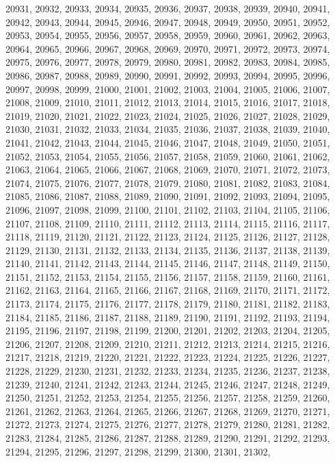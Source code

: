 20931,
20932,
20933,
20934,
20935,
20936,
20937,
20938,
20939,
20940,
20941,
20942,
20943,
20944,
20945,
20946,
20947,
20948,
20949,
20950,
20951,
20952,
20953,
20954,
20955,
20956,
20957,
20958,
20959,
20960,
20961,
20962,
20963,
20964,
20965,
20966,
20967,
20968,
20969,
20970,
20971,
20972,
20973,
20974,
20975,
20976,
20977,
20978,
20979,
20980,
20981,
20982,
20983,
20984,
20985,
20986,
20987,
20988,
20989,
20990,
20991,
20992,
20993,
20994,
20995,
20996,
20997,
20998,
20999,
21000,
21001,
21002,
21003,
21004,
21005,
21006,
21007,
21008,
21009,
21010,
21011,
21012,
21013,
21014,
21015,
21016,
21017,
21018,
21019,
21020,
21021,
21022,
21023,
21024,
21025,
21026,
21027,
21028,
21029,
21030,
21031,
21032,
21033,
21034,
21035,
21036,
21037,
21038,
21039,
21040,
21041,
21042,
21043,
21044,
21045,
21046,
21047,
21048,
21049,
21050,
21051,
21052,
21053,
21054,
21055,
21056,
21057,
21058,
21059,
21060,
21061,
21062,
21063,
21064,
21065,
21066,
21067,
21068,
21069,
21070,
21071,
21072,
21073,
21074,
21075,
21076,
21077,
21078,
21079,
21080,
21081,
21082,
21083,
21084,
21085,
21086,
21087,
21088,
21089,
21090,
21091,
21092,
21093,
21094,
21095,
21096,
21097,
21098,
21099,
21100,
21101,
21102,
21103,
21104,
21105,
21106,
21107,
21108,
21109,
21110,
21111,
21112,
21113,
21114,
21115,
21116,
21117,
21118,
21119,
21120,
21121,
21122,
21123,
21124,
21125,
21126,
21127,
21128,
21129,
21130,
21131,
21132,
21133,
21134,
21135,
21136,
21137,
21138,
21139,
21140,
21141,
21142,
21143,
21144,
21145,
21146,
21147,
21148,
21149,
21150,
21151,
21152,
21153,
21154,
21155,
21156,
21157,
21158,
21159,
21160,
21161,
21162,
21163,
21164,
21165,
21166,
21167,
21168,
21169,
21170,
21171,
21172,
21173,
21174,
21175,
21176,
21177,
21178,
21179,
21180,
21181,
21182,
21183,
21184,
21185,
21186,
21187,
21188,
21189,
21190,
21191,
21192,
21193,
21194,
21195,
21196,
21197,
21198,
21199,
21200,
21201,
21202,
21203,
21204,
21205,
21206,
21207,
21208,
21209,
21210,
21211,
21212,
21213,
21214,
21215,
21216,
21217,
21218,
21219,
21220,
21221,
21222,
21223,
21224,
21225,
21226,
21227,
21228,
21229,
21230,
21231,
21232,
21233,
21234,
21235,
21236,
21237,
21238,
21239,
21240,
21241,
21242,
21243,
21244,
21245,
21246,
21247,
21248,
21249,
21250,
21251,
21252,
21253,
21254,
21255,
21256,
21257,
21258,
21259,
21260,
21261,
21262,
21263,
21264,
21265,
21266,
21267,
21268,
21269,
21270,
21271,
21272,
21273,
21274,
21275,
21276,
21277,
21278,
21279,
21280,
21281,
21282,
21283,
21284,
21285,
21286,
21287,
21288,
21289,
21290,
21291,
21292,
21293,
21294,
21295,
21296,
21297,
21298,
21299,
21300,
21301,
21302,
